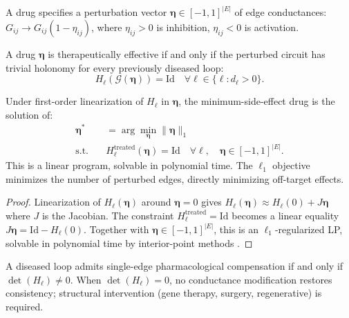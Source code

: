 \documentclass[twocolumn,11pt,a4paper]{article}
\newcommand{\Gcond}{\mathcal{G}}
\newcommand{\HolL}{H_\ell}
\newcommand{\drugvec}{\boldsymbol{\eta}}
\begin{document}
\begin{definition}\label{def:drug}
A drug specifies a perturbation vector
$\drugvec \in [-1,1]^{|E|}$ of edge conductances:
$G_{ij} \to G_{ij}(1 - \eta_{ij})$,
where $\eta_{ij} > 0$ is inhibition, $\eta_{ij} < 0$ is activation.
\end{definition}

\begin{theorem}\label{thm:therapy}
A drug $\drugvec$ is therapeutically effective if and only if the
perturbed circuit has trivial holonomy for every previously diseased loop:
\[
\HolL(\Gcond(\drugvec)) = \mathrm{Id} \quad \forall \ell \in
\{\ell : d_\ell > 0\}.
\]
\end{theorem}

\begin{theorem}\label{thm:sparse}
Under first-order linearization of $\HolL$ in $\drugvec$, the
minimum-side-effect drug is the solution of:
\begin{equation}
\begin{aligned}
\drugvec^* &= \arg\min_{\drugvec} \|\drugvec\|_1 \\
\text{s.t.} \quad &\HolL^{\mathrm{treated}}(\drugvec) = \mathrm{Id}
\quad \forall \ell,\quad \drugvec \in [-1,1]^{|E|}.
\end{aligned}
\label{eq:L1}
\end{equation}
This is a linear program, solvable in polynomial time. The $\ell_1$
objective minimizes the number of perturbed edges, directly minimizing
off-target effects.
\end{theorem}

\begin{proof}
Linearization of $\HolL(\drugvec)$ around $\drugvec=0$ gives
$\HolL(\drugvec) \approx \HolL(0) + J\drugvec$ where $J$ is the
Jacobian. The constraint $\HolL^{\mathrm{treated}} = \mathrm{Id}$ becomes
a linear equality $J\drugvec = \mathrm{Id} - \HolL(0)$. Together with
$\drugvec\in[-1,1]^{|E|}$, this is an $\ell_1$-regularized LP,
solvable in polynomial time by interior-point methods \cite{dantzig1963}.
\end{proof}

\begin{theorem}[Reversibility]\label{thm:reversibility}
A diseased loop admits single-edge pharmacological compensation if and
only if $\det(\HolL) \neq 0$. When $\det(\HolL) = 0$, no
conductance modification restores consistency; structural intervention
(gene therapy, surgery, regenerative) is required.
\end{theorem}
\end{document}
